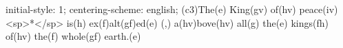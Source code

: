 initial-style: 1;
centering-scheme: english;
(c3)The(e) King(gv) of(hv) peace(iv) <sp>*</sp> is(h) ex(f)alt(gf)ed(e) (,) a(hv)bove(hv) all(g) the(e) kings(fh) of(hv) the(f) whole(gf) earth.(e)
